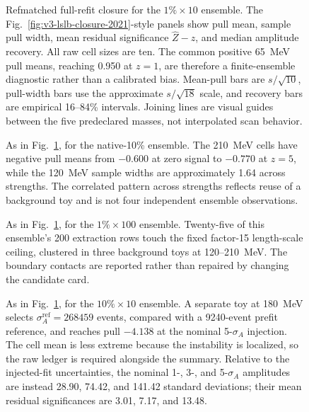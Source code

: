 {\begin{figure}[p]
\centering
{}
\caption{Refmatched full-refit closure for the $1\%\times10$ ensemble.  The
Fig.~\ref{fig:v3-lslb-closure-2021}-style panels show pull mean, sample pull width,
mean residual significance $\widehat Z-z$, and median amplitude recovery.  All raw
cell sizes are ten.  The common positive 65~MeV pull means, reaching 0.950 at
$z=1$, are therefore a finite-ensemble diagnostic rather than a calibrated bias.
Mean-pull bars are $s/\sqrt{10}$, pull-width bars use the approximate
$s/\sqrt{18}$ scale, and recovery bars are empirical 16--84\% intervals.
Joining lines are visual guides between the five predeclared masses, not
interpolated scan behavior.}
\label{fig:v4p5-closure-1pct-x10}
\end{figure}

\begin{figure}[p]
\centering
{}
\caption{As in Fig.~\ref{fig:v4p5-closure-1pct-x10}, for the native-10\% ensemble.
The 210~MeV cells have negative pull means from $-0.600$ at zero signal to $-0.770$
at $z=5$, while the 120~MeV sample widths are approximately 1.64 across strengths.
The correlated pattern across strengths reflects reuse of a background toy and is
not four independent ensemble observations.}
\label{fig:v4p5-closure-10pct}
\end{figure}

\begin{figure}[p]
\centering
{}
\caption{As in Fig.~\ref{fig:v4p5-closure-1pct-x10}, for the
$1\%\times100$ ensemble.  Twenty-five of this ensemble's 200 extraction rows touch
the fixed factor-15 length-scale ceiling, clustered in three background toys at
120--210~MeV.  The boundary contacts are reported rather than repaired by changing
the candidate card.}
\label{fig:v4p5-closure-1pct-x100}
\end{figure}

\begin{figure}[p]
\centering
{}
\caption{As in Fig.~\ref{fig:v4p5-closure-1pct-x10}, for the
$10\%\times10$ ensemble.  A separate toy at 180~MeV selects
$\sigma_A^{\mathrm{ref}}=268459$ events, compared with a 9240-event prefit reference,
and reaches pull $-4.138$ at the nominal 5-$\sigma_A$ injection.  The cell mean is
less extreme because the instability is localized, so the raw ledger is required
alongside the summary.  Relative to the injected-fit uncertainties, the nominal
1-, 3-, and 5-$\sigma_A$ amplitudes are instead 28.90, 74.42, and 141.42 standard
deviations; their mean residual significances are 3.01, 7.17, and 13.48.}
\label{fig:v4p5-closure-10pct-x10}
\end{figure}

}
